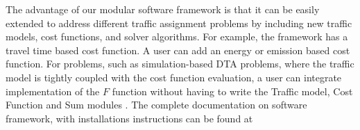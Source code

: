 The advantage of our modular software framework is that it can be easily extended to address different traffic assignment problems by including new traffic models, cost functions, and solver algorithms. For example, the framework has a travel time based cost function. A user can add an energy or emission based cost function. For problems, such as simulation-based DTA problems, where the traffic model is tightly coupled with the cost function evaluation, a user can integrate implementation of the $F$ function without having to write the Traffic model, Cost Function and Sum modules . The complete documentation on software framework, with installations instructions can be found at \cite{ta_solver}